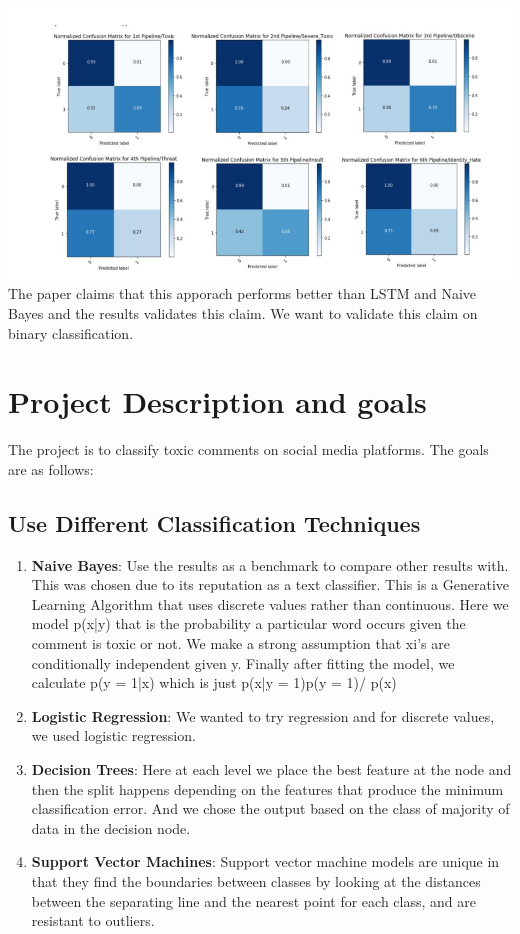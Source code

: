 \documentclass[11pt]{article}
\begin{document}
\includegraphics[scale=0.9]{figs/chakra_all.png}
The paper claims that this apporach performs better than
LSTM and Naive Bayes and the results validates this claim. 
We want to validate this claim on binary classification.
\section{Project Description and goals}
The project is to classify toxic comments on social media platforms. The goals are as follows:
\subsection*{Use Different Classification Techniques}
\begin{enumerate}
	\item \textbf{Naive Bayes}: Use the results as a benchmark to 
	compare other results with. This was chosen due to its reputation as a text classifier. This is a Generative Learning Algorithm that uses discrete values rather than continuous. Here we model p(x|y) that is the probability a particular word occurs given the comment is toxic or not. We make a strong assumption that xi's are conditionally independent given y. Finally after fitting the model, we calculate
	p(y = 1|x) which is just p(x|y = 1)p(y = 1)/ p(x)
	
	\item \textbf{Logistic Regression}: We wanted to try regression and for discrete values, we used logistic regression.
	\item \textbf{Decision Trees}: Here at each level we place the best feature at the node and then the split happens  depending on the features that produce the minimum classification error. And we chose the output based on the class of majority of data in the decision node.

	\item \textbf{Support Vector Machines}: Support vector machine models are unique in that they find the boundaries between classes by looking at the distances between the separating line and the nearest point for each class, and are resistant to outliers. 

\end{enumerate}
\end{document}
